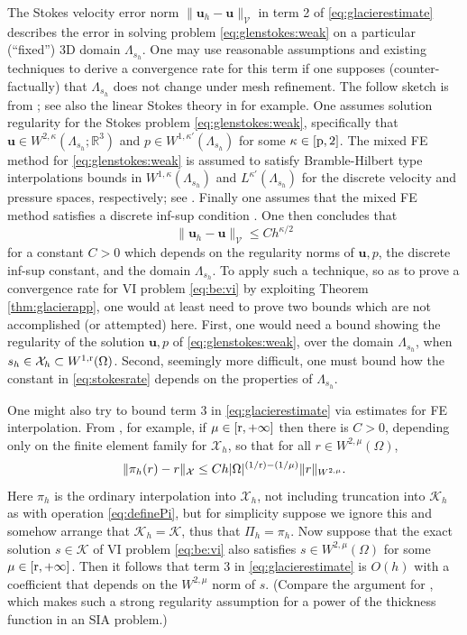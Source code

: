 \documentclass[hidelinks,onefignum,onetabnum,final]{siamart220329}  %
\newcommand{\RR}{\mathbb{R}}
\newcommand{\bu}{\mathbf{u}}
\newcommand{\cK}{\mathcal{K}}
\newcommand{\cV}{\mathcal{V}}
\newcommand{\cX}{\mathcal{X}}
\newcommand{\pp}{{\text{\textnormal{p}}}}
\newcommand{\rr}{{\text{\textnormal{r}}}}
\begin{document}
The Stokes velocity error norm $\|\bu_h - \bu\|_{\cV}$ in term 2 of \eqref{eq:glacierestimate} describes the error in solving problem \eqref{eq:glenstokes:weak} on a particular (``fixed'') 3D domain $\Lambda_{s_h}$.  One may use reasonable assumptions and existing techniques to derive a convergence rate for this term if one supposes (counter-factually) that $\Lambda_{s_h}$ does not change under mesh refinement.  The follow sketch is from \cite[Theorem 4.9]{JouvetRappaz2011}; see also the linear Stokes theory in \cite{Elmanetal2014} for example.  One assumes solution regularity for the Stokes problem \eqref{eq:glenstokes:weak}, specifically that $\bu\in W^{2,\kappa}(\Lambda_{s_h};\RR^3)$ and $p \in W^{1,\kappa'}(\Lambda_{s_h})$ for some $\kappa \in [\pp,2]$.  The mixed FE method for \eqref{eq:glenstokes:weak} is assumed to satisfy Bramble-Hilbert type interpolations bounds in $W^{1,\kappa}(\Lambda_{s_h})$ and $L^{\kappa'}(\Lambda_{s_h})$ for the discrete velocity and pressure spaces, respectively; see \cite[inequalities (4.26), (4.27)]{JouvetRappaz2011}.  Finally one assumes that the mixed FE method satisfies a discrete inf-sup condition \cite[equation (4.1)]{JouvetRappaz2011}.  One then concludes that
\begin{equation}
\|\bu_h - \bu\|_{\cV} \le C h^{\kappa/2}
\label{eq:stokesrate}
\end{equation}
for a constant $C>0$ which depends on the regularity norms of $\bu,p$, the discrete inf-sup constant, and the domain $\Lambda_{s_h}$.  To apply such a technique, so as to prove a convergence rate for VI problem \eqref{eq:be:vi} by exploiting Theorem \ref{thm:glacierapp}, one would at least need to prove two bounds which are not accomplished (or attempted) here.  First, one would need a bound showing the regularity of the solution $\bu,p$ of \eqref{eq:glenstokes:weak}, over the domain $\Lambda_{s_h}$, when $s_h \in \cX_h \subset W^{1,\rr}(\Omega)$.  Second, seemingly more difficult, one must bound how the constant in \eqref{eq:stokesrate} depends on the properties of $\Lambda_{s_h}$.

One might also try to bound term 3 in \eqref{eq:glacierestimate} via estimates for FE interpolation.  From \cite[Theorem 3.1.6]{Ciarlet2002}, for example, if $\mu \in [\rr,+\infty]$ then there is $C>0$, depending only on the finite element family for $\cX_h$, so that for all $r \in W^{2,\mu}(\Omega)$,
\begin{equation}
\|\pi_h(r) - r\|_{\cX} \le C h |\Omega|^{(1/\rr)-(1/\mu)} \|r\|_{W^{2,\mu}}. \label{eq:ciarletregularity}
\end{equation}
Here $\pi_h$ is the ordinary interpolation into $\cX_h$, not including truncation into $\cK_h$ as with operation \eqref{eq:definePi}, but for simplicity suppose we ignore this and somehow arrange that $\cK_h=\cK$, thus that $\Pi_h=\pi_h$.  Now suppose that the exact solution $s\in\cK$ of VI problem \eqref{eq:be:vi} also satisfies $s\in W^{2,\mu}(\Omega)$ for some $\mu \in [\rr,+\infty]$.  Then it follows that term 3 in \eqref{eq:glacierestimate} is $O(h)$ with a coefficient that depends on the $W^{2,\mu}$ norm of $s$.  (Compare the argument for \cite[Theorem 4.3]{JouvetBueler2012}, which makes such a strong regularity assumption for a power of the thickness function in an SIA problem.)
\end{document}
